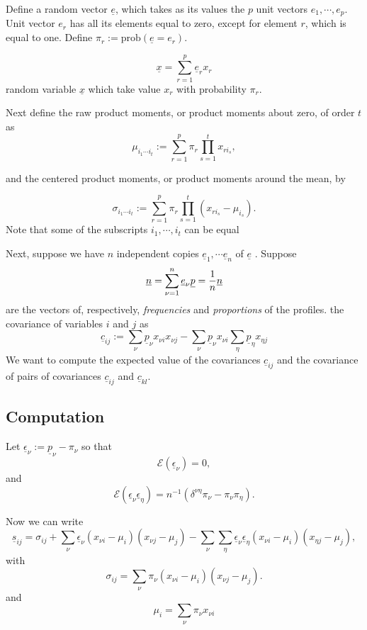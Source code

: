 \documentclass[
  12pt,
  letterpaper,
  DIV=11,
  numbers=noendperiod]{scrartcl}
\newcommand{\ul}[1]{\underline{#1}}
\begin{document}
Define a random vector \(\ul{e}\), which takes as its values the \(p\)
unit vectors \(e_1,\cdots,e_p\). Unit vector \(e_r\) has all its
elements equal to zero, except for element \(r\), which is equal to one.
Define \(\pi_r:=\text{prob}(\ul{e}=e_r)\).

\[
\ul{x}=\sum_{r=1}^p\ul{e}_rx_r
\] random variable \(\ul{x}\) which take value \(x_r\) with probability
\(\pi_r\).

Next define the raw product moments, or product moments about zero, of
order \(t\) as \[
\mu_{i_1\cdots i_t}:=\sum_{r=1}^p \pi_r\prod_{s=1}^tx_{ri_s},
\]

and the centered product moments, or product moments around the mean, by

\[
\sigma_{i_1\cdots i_t}:=\sum_{r=1}^p \pi_r\prod_{s=1}^t(x_{ri_s}-\mu_{i_s}).
\] Note that some of the subscripts \(i_1,\cdots,i_t\) can be equal

Next, suppose we have \(n\) independent copies
\(\ul{e}_1,\cdots\ul{e}_n\) of \(\ul{e}\) . Suppose \[
\ul{n}=\sum_{\nu=1}^n\ul{e}_\nu\\
\ul{p}=\frac{1}{n}\ul{n}
\] are the vectors of, respectively, \emph{frequencies} and
\emph{proportions} of the profiles. the covariance of variables \(i\)
and \(j\) as \[
\ul{c}_{ij}:=\sum_\nu \ul{p}_\nu x_{\nu i}x_{\nu j}-\sum_\nu \ul{p}_\nu x_{\nu i}\sum_\eta\ul{p}_\eta x_{\eta j}
\] We want to compute the expected value of the covariances
\(\ul{c}_{ij}\) and the covariance of pairs of covariances
\(\ul{c}_{ij}\) and \(\ul{c}_{kl}\).

\subsection{Computation}\label{computation}

Let \(\ul{\epsilon}_\nu:=\ul{p}_\nu-\pi_\nu\) so that \[
\mathcal{E}(\ul{\epsilon}_\nu)=0,
\] and \[
\mathcal{E}(\ul{\epsilon}_\nu\ul{\epsilon}_\eta)=n^{-1}(\delta^{\nu\eta}\pi_\nu-\pi_\nu\pi_\eta).
\]

Now we can write \[
\ul{s}_{ij}=\sigma_{ij}+\sum_\nu \ul{\epsilon}_\nu(x_{\nu i}-\mu_i)(x_{\nu j}-\mu_j)
-\sum_\nu\sum_\eta\ul{\epsilon}_\nu\ul{\epsilon}_\eta(x_{\nu i}-\mu_i)(x_{\eta j}-\mu_j),
\] with \[
\sigma_{ij}=\sum_\nu\pi_\nu(x_{\nu i}-\mu_i)(x_{\nu j}-\mu_j).
\] and \[
\mu_i=\sum_\nu \pi_\nu x_{\nu i}
\]
\end{document}
